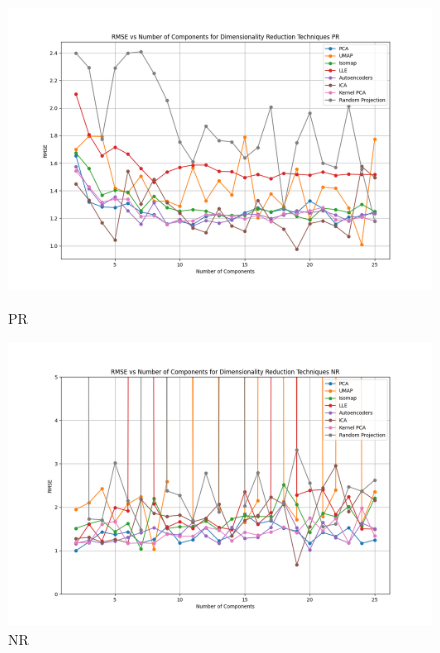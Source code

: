 \begin{figure}[H]
    \centering
    \begin{minipage}{0.45\textwidth}
        \centering
        \includegraphics[width=\linewidth]{reg_section_all/images_dimred_results/dimensionality_reduction_rmse_plot_PR_best.png}
        \caption{PR}
        \label{fig:pr_reg_dimred_training}
    \end{minipage}\hfill
    \begin{minipage}{0.45\textwidth}
        \centering
        \includegraphics[width=\linewidth]{reg_section_all/images_dimred_results/dimensionality_reduction_rmse_plot_NR_best.png}
        \caption{NR}
        \label{fig:nr_reg_dimred_training}
    \end{minipage}
\end{figure}

